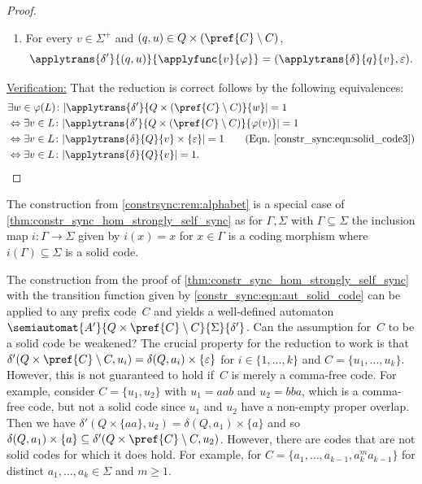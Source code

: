 \begin{proof}
\begin{enumerate}
		\item  \label{constr_sync:solid_code_morphism:wordsvarphi} For every $v \in \Sigma^+$ and $(q,u) \in Q \times (\pref{C} \setminus C)$,
		\begin{equation}\label{constr_sync:eqn:solid_code3}
			\applytrans{\delta'}{(q,u)}{\applyfunc{v}{\varphi}} = (\applytrans{\delta}{q}{v}, \varepsilon).
		\end{equation}
	\end{enumerate}	
	
	\medskip 
	\noindent\underline{Verification:} That the reduction is correct follows by the following
	equivalences:
	\begin{align*}
		& \exists w \in \varphi(L) \colon |\applytrans{\delta'}{Q \times (\pref{C}\setminus C)}{w}|  = 1 \\
		& \Leftrightarrow \exists v \in L \colon |\applytrans{\delta'}{Q \times (\pref{C}\setminus C)}{\varphi(v)}|  = 1 \\
		& \Leftrightarrow \exists v \in L \colon |\applytrans{\delta}{Q}{v} \times \{\varepsilon\}| = 1 \tag{Eqn.~\eqref{constr_sync:eqn:solid_code3}} \\
		& \Leftrightarrow \exists v \in L \colon |\applytrans{\delta}{Q}{v}| = 1. \qedhere
	\end{align*}
\end{proof}

\begin{remark} \label{constrsync:rem:alphabet_solid_special_case}
	The construction from \cref{constrsync:rem:alphabet} is a special case 
	of \cref{thm:constr_sync_hom_strongly_self_sync}
	as for $\Gamma, \Sigma$ with $\Gamma \subseteq \Sigma$
	the inclusion map $i \colon \Gamma \to \Sigma$
	given by $i(x) = x$ for $x \in \Gamma$
	is a coding morphism where $i(\Gamma) \subseteq \Sigma$ is a solid code.
\end{remark} 

\begin{remark}
	The construction from the proof of \cref{thm:constr_sync_hom_strongly_self_sync}
	with the transition function given by \cref{constr_sync:eqn:aut_solid_code}
	can be applied to any prefix code~$C$
	and yields a well-defined automaton~$\semiautomat{A'}{Q \times \pref{C}\setminus C}{\Sigma}{\delta'}$.	
	Can the assumption for~$C$ to be a solid code
	be weakened? 
	The crucial property for the reduction
	to work is that $\delta'(Q \times \pref{C} \setminus C, u_i) = \delta(Q, a_i) \times \{\varepsilon\}$
	for $i \in \{1,\ldots,k\}$ and $C = \{u_1, \ldots, u_k\}$.
	However, this is not guaranteed to hold if~$C$
	is merely a comma-free code.
	For example, consider $C = \{ u_1, u_2 \}$ with $u_1 = aab$ and $u_2 = bba$,
	which is a comma-free code, but not a solid code since $u_1$ and $u_2$ have a
	non-empty proper overlap.
	Then we have
	$
	\delta'(Q \times \{aa\}, u_2) = \delta(Q, a_1) \times \{a\}  	
	$
	and so $\delta(Q, a_1) \times \{a\} \subseteq \delta'(Q \times \pref{C} \setminus C, u_2)$.
	However, there are codes that are not solid codes for which it does hold.
	For example, for $C = \{ a_1, \ldots, a_{k-1}, a_k^m a_{k-1}\}$ for distinct $a_1, \ldots, a_k \in \Sigma$
	and $m \ge 1$.
\end{remark}

